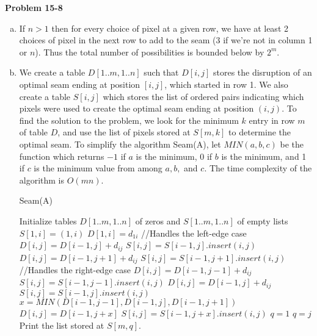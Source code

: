 \documentclass{article}
\begin{document}
\noindent\textbf{Problem 15-8}\\
\begin{enumerate}[a.]
\item If $n>1$ then for every choice of pixel at a given row, we have at least 2 choices of pixel in the next row to add to the seam (3 if we're not in column 1 or $n$).  Thus the total number of possibilities is bounded below by $2^m$. \\

\item We create a table $D[1..m,1..n]$ such that $D[i,j]$ stores the disruption of an optimal seam ending at position $[i,j]$, which started in row 1.  We also create a table $S[i,j]$ which stores the list of ordered pairs indicating which pixels were used to create the optimal seam ending at position $(i,j)$.  To find the solution to the problem, we look for the minimum $k$ entry in row $m$ of table $D$, and use the list of pixels stored at $S[m,k]$ to determine the optimal seam.  To simplify the algorithm Seam(A), let $MIN(a,b,c)$ be the function which returns $-1$ if $a$ is the minimum, 0 if $b$ is the minimum, and 1 if $c$ is the minimum value from among $a, b, $ and $c$.  The time complexity of the algorithm is $O(mn)$.\\

\begin{algorithm}
\caption{Seam(A)}
\begin{algorithmic}
\State Initialize tables $D[1..m,1..n]$ of zeros and $S[1..m,1..n]$ of empty lists
	\State $S[1,i] = (1,i)$
	\State $D[1,i] = d_{1i}$
\EndFor
{}
		 //Handles the left-edge case
				\State $D[i,j] = D[i-1,j] + d_{ij}$
				\State $S[i,j] = S[i-1,j].insert(i,j)$
			\Else
				\State $D[i,j] = D[i-1,j+1] + d_{ij}$
				\State $S[i,j] = S[i-1,j+1].insert(i,j)$
			\EndIf
		 //Handles the right-edge case
				\State $D[i,j] = D[i-1,j-1] + d_{ij}$
				\State $S[i,j] = S[i-1,j-1].insert(i,j)$
			\Else
				\State $D[i,j] = D[i-1,j] + d_{ij}$
				\State $S[i,j] = S[i-1,j].insert(i,j)$
			\EndIf
		\EndIf
		\State $x = MIN(D[i-1,j-1], D[i-1,j], D[i-1,j+1])$
		\State $D[i,j] = D[i-1,j+x]$
		\State $S[i,j] = S[i-1,j+x].insert(i,j)$
	\EndFor
\EndFor
\State $q = 1$
		$q = j$
	\EndIf
\EndFor
\State Print the list stored at $S[m,q]$.
\end{algorithmic}
\end{algorithm}
\end{enumerate}
\end{document}
